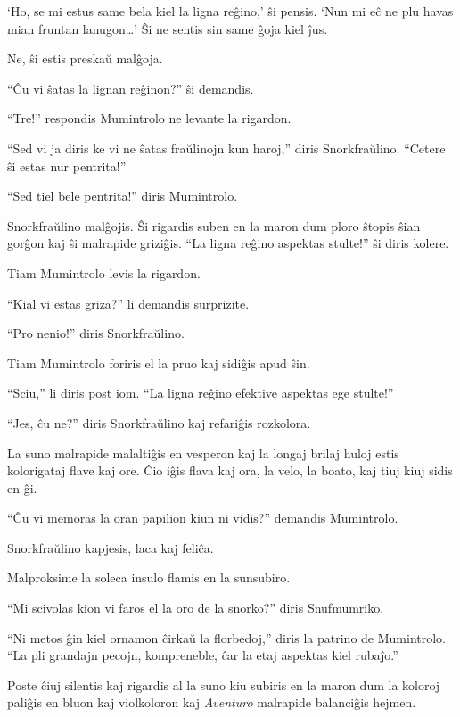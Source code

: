 `Ho, se mi estus same bela kiel la ligna reĝino,' ŝi pensis. `Nun mi eĉ ne plu havas mian fruntan lanugon{\ldots}' Ŝi ne sentis sin same ĝoja kiel ĵus.

Ne, ŝi estis preskaŭ malĝoja.

``Ĉu vi ŝatas la lignan reĝinon?'' ŝi demandis.

``Tre!'' respondis Mumintrolo ne levante la rigardon.

``Sed vi ja diris ke vi ne ŝatas fraŭlinojn kun haroj,'' diris Snorkfraŭlino. ``Cetere ŝi estas nur pentrita!''

``Sed tiel bele pentrita!'' diris Mumintrolo.

Snorkfraŭlino malĝojis. Ŝi rigardis suben en la maron dum ploro ŝtopis ŝian gorĝon kaj ŝi malrapide griziĝis. ``La ligna reĝino aspektas stulte!'' ŝi diris kolere.

Tiam Mumintrolo levis la rigardon.

``Kial vi estas griza?'' li demandis surprizite.

``Pro nenio!'' diris Snorkfraŭlino.

Tiam Mumintrolo foriris el la pruo kaj sidiĝis apud ŝin.

``Sciu,'' li diris post iom. ``La ligna reĝino efektive aspektas ege stulte!''

``Jes, ĉu ne?'' diris Snorkfraŭlino kaj refariĝis rozkolora.

La suno malrapide malaltiĝis en vesperon kaj la longaj brilaj huloj estis kolorigataj flave kaj ore. Ĉio iĝis flava kaj ora, la velo, la boato, kaj tiuj kiuj sidis en ĝi.

``Ĉu vi memoras la oran papilion kiun ni vidis?'' demandis Mumintrolo.

Snorkfraŭlino kapjesis, laca kaj feliĉa.

Malproksime la soleca insulo flamis en la sunsubiro.

``Mi scivolas kion vi faros el la oro de la snorko?'' diris Snufmumriko.

``Ni metos ĝin kiel ornamon ĉirkaŭ la florbedoj,'' diris la patrino de Mumintrolo. ``La pli grandajn pecojn, kompreneble, ĉar la etaj aspektas kiel rubaĵo.''

Poste ĉiuj silentis kaj rigardis al la suno kiu subiris en la maron dum la koloroj paliĝis en bluon kaj violkoloron kaj \emph{Aventuro} malrapide balanciĝis hejmen.

